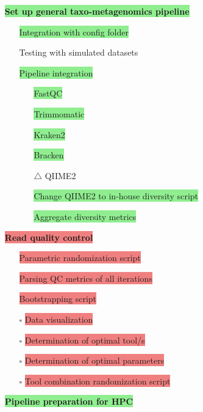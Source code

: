 \documentclass[11pt]{article}
\newcommand{\done}{\checkmark}  %
\newcommand{\pending}{$\square$}  %
\newcommand{\issue}{$\triangle$}  %
\newcommand{\highlightessential}[1]{\colorbox{lightgreen}{#1}}  %
\newcommand{\highlightoptional}[1]{\colorbox{lightorange}{#1}}  %
\newcommand{\highlightrobust}[1]{\colorbox{lightcoral}{#1}}  %
\begin{document}
\begin{itemize}
	\item [\done] \par\noindent\highlightessential{\textbf{\large Set up general taxo-metagenomics pipeline}}
	\begin{itemize}
		\item [\done] \highlightessential{Integration with config folder}
		\item [\done] \highlightoptional{Testing with simulated datasets}
		\item [\done] \highlightessential{Pipeline integration}
			\begin{itemize}
				\item [\done] \highlightessential{FastQC}
				\item [\done] \highlightessential{Trimmomatic}
				\item [\done] \highlightessential{Kraken2}
				\item [\done] \highlightessential{Bracken}
				\item [\issue] \highlightoptional{QIIME2}
				\item [\done] \highlightessential{Change QIIME2 to in-house diversity script}
				\item [\done] \highlightessential{Aggregate diversity metrics}
			\end{itemize}
	\end{itemize}
	\item [\done] \par\noindent\highlightrobust{\textbf{\large Read quality control}}
		\begin{itemize}
			\item [\done] \highlightrobust{Parametric randomization script}
			\item [\done] \highlightrobust{Parsing QC metrics of all iterations}
			\item [\done] \highlightrobust{Bootstrapping script}
			\item [\pending] \highlightrobust{Data visualization}
			\item [\pending] \highlightrobust{Determination of optimal tool/s}
			\item [\pending] \highlightrobust{Determination of optimal parameters}
			\item [\pending] \highlightrobust{Tool combination randomization script}
		\end{itemize}
	\item [\done] \par\noindent\highlightessential{\textbf{\large Pipeline preparation for HPC}}


\end{itemize}
\end{document}
